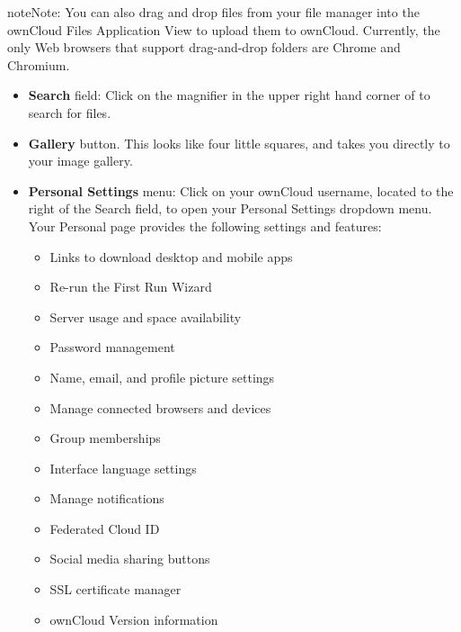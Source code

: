 \documentclass[letterpaper,10pt,english]{sphinxmanual}
\begin{document}
\begin{notice}{note}{Note:}
You can also drag and drop files from your file manager into the
ownCloud Files Application View to upload them to ownCloud. Currently,
the only Web browsers that support drag-and-drop folders are Chrome and
Chromium.
\end{notice}
\begin{itemize}
\item {} 
\textbf{Search} field: Click on the magnifier in the upper right hand corner of
to search for files.

\item {} 
\textbf{Gallery} button. This looks like four little squares, and takes you
directly to your image gallery.

\item {} 
\textbf{Personal Settings} menu: Click on your ownCloud username, located to the
right of the Search field, to open your Personal Settings dropdown menu. Your
Personal page provides the following settings and features:
\begin{itemize}
\item {} 
Links to download desktop and mobile apps

\item {} 
Re-run the First Run Wizard

\item {} 
Server usage and space availability

\item {} 
Password management

\item {} 
Name, email, and profile picture settings

\item {} 
Manage connected browsers and devices

\item {} 
Group memberships

\item {} 
Interface language settings

\item {} 
Manage notifications

\item {} 
Federated Cloud ID

\item {} 
Social media sharing buttons

\item {} 
SSL certificate manager

\item {} 
ownCloud Version information

\end{itemize}

\end{itemize}
\end{document}
